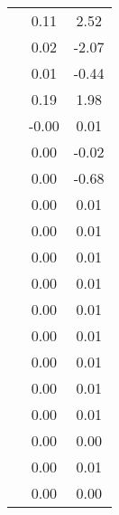 \begin{table}
\begin{tabular}{c|cc|}
\multicolumn{1}{|c|}{} & \multicolumn{1}{|c|}{      0.11} & \multicolumn{1}{|c|}{      2.52} \\ 
\multicolumn{1}{|c|}{} & \multicolumn{1}{|c|}{      0.02} & \multicolumn{1}{|c|}{     -2.07} \\ 
\multicolumn{1}{|c|}{} & \multicolumn{1}{|c|}{      0.01} & \multicolumn{1}{|c|}{     -0.44} \\ 
\multicolumn{1}{|c|}{} & \multicolumn{1}{|c|}{      0.19} & \multicolumn{1}{|c|}{      1.98} \\ 
\multicolumn{1}{|c|}{} & \multicolumn{1}{|c|}{     -0.00} & \multicolumn{1}{|c|}{      0.01} \\ 
\multicolumn{1}{|c|}{} & \multicolumn{1}{|c|}{      0.00} & \multicolumn{1}{|c|}{     -0.02} \\ 
\multicolumn{1}{|c|}{} & \multicolumn{1}{|c|}{      0.00} & \multicolumn{1}{|c|}{     -0.68} \\ 
\multicolumn{1}{|c|}{} & \multicolumn{1}{|c|}{      0.00} & \multicolumn{1}{|c|}{      0.01} \\ 
\multicolumn{1}{|c|}{} & \multicolumn{1}{|c|}{      0.00} & \multicolumn{1}{|c|}{      0.01} \\ 
\multicolumn{1}{|c|}{} & \multicolumn{1}{|c|}{      0.00} & \multicolumn{1}{|c|}{      0.01} \\ 
\multicolumn{1}{|c|}{} & \multicolumn{1}{|c|}{      0.00} & \multicolumn{1}{|c|}{      0.01} \\ 
\multicolumn{1}{|c|}{} & \multicolumn{1}{|c|}{      0.00} & \multicolumn{1}{|c|}{      0.01} \\ 
\multicolumn{1}{|c|}{} & \multicolumn{1}{|c|}{      0.00} & \multicolumn{1}{|c|}{      0.01} \\ 
\multicolumn{1}{|c|}{} & \multicolumn{1}{|c|}{      0.00} & \multicolumn{1}{|c|}{      0.01} \\ 
\multicolumn{1}{|c|}{} & \multicolumn{1}{|c|}{      0.00} & \multicolumn{1}{|c|}{      0.01} \\ 
\multicolumn{1}{|c|}{} & \multicolumn{1}{|c|}{      0.00} & \multicolumn{1}{|c|}{      0.01} \\ 
\multicolumn{1}{|c|}{} & \multicolumn{1}{|c|}{      0.00} & \multicolumn{1}{|c|}{      0.00} \\ 
\multicolumn{1}{|c|}{} & \multicolumn{1}{|c|}{      0.00} & \multicolumn{1}{|c|}{      0.01} \\ 
\multicolumn{1}{|c|}{} & \multicolumn{1}{|c|}{      0.00} & \multicolumn{1}{|c|}{      0.00} \\ 

\end{tabular}
\end{table}
